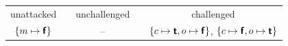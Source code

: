 \documentclass[25pt,a0paper,portrait,margin=2mm, innermargin=30mm, blockverticalspace=20mm, colspace=20mm, subcolspace=10mm]{tikzposter}
\theoremstyle{definition}
\begin{document}
\begin{columns}
{\begin{center}
\begin{af}
        \end{af}
    \end{center}

    \centering
    \vspace{1cm}

    \\[0.7ex]    
    \begin{tabular}{clclc}
        unattacked && unchallenged && challenged \\
        $\{m \mapsto \boldsymbol{\mathsf{f}}\}$ &\phantom{xx}& -- &\phantom{xx}& $\{c \mapsto\boldsymbol{\mathsf{t}}, o\mapsto\boldsymbol{\mathsf{f}}\}$, $\{c\mapsto\boldsymbol{\mathsf{f}},o\mapsto\boldsymbol{\mathsf{t}}\}$
    \end{tabular}
    \vspace{-0.175cm}
}

\end{columns}
\end{document}
